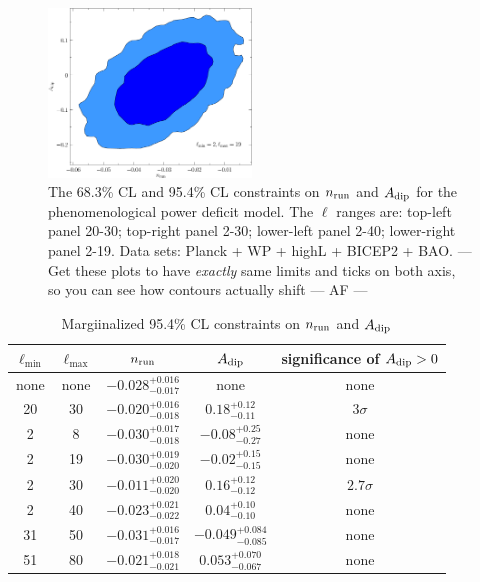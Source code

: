 \documentclass[a4paper,11pt]{article}
\def \halffigwidth{0.48\textwidth}
\begin{document}
\begin{figure}
  \includegraphics[width = \halffigwidth]{ldip2to19_nrun_dipamp_2D.pdf} 
  \caption{The 68.3\% CL and 95.4\% CL constraints on $n_{\rm run}$ and $A_{\rm dip}$ for the phenomenological power deficit model. The $\ell$ ranges are: top-left panel 20-30;  top-right panel 2-30; lower-left panel 2-40; lower-right panel 2-19. Data sets: Planck + WP + highL + BICEP2 + BAO. {\color{red} --- Get these plots to have \textit{exactly} same limits and ticks on both axis, so you can see how contours actually shift --- AF ---} \label{fig:nrunadip}}
\end{figure}


\begin{table}
\caption{Margiinalized 95.4\% CL constraints on $n_{\rm run}$ and $A_{\rm dip}$ \label{tbl:nrunadip}}
\centering
\begin{tabular}{ccccc}
\hline
\hline
$\ell_{\min}$ & $\ell_{\max}$ & $n_{\rm run}$ & $A_{\rm dip}$ & significance of $A_{\rm dip}>0$\\
\hline
none & none & $-0.028^{+0.016}_{-0.017}$ & none & none \\
20   & 30 & $-0.020^{+0.016}_{-0.018}$ & $0.18^{+0.12}_{-0.11}$ & $3\sigma$\\
2 & 8 & $-0.030^{+0.017}_{-0.018}$  & $-0.08^{+0.25}_{-0.27}$ & none \\
2 & 19 & $-0.030^{+0.019}_{-0.020}$ &    $-0.02^{+0.15}_{-0.15}$ & none \\
2 & 30 &  $-0.011^{+0.020}_{-0.020}$   & $0.16^{+0.12}_{-0.12}$ & $2.7\sigma$\\
2 & 40 & $-0.023^{+0.021}_{-0.022}$  &  $0.04^{+0.10}_{-0.10}$ & none \\
31 & 50 & $-0.031^{+0.016}_{-0.017}$  & $-0.049^{+0.084}_{-0.085}$ & none\\
51 & 80 & $-0.021^{+0.018}_{-0.021}$  & $0.053^{+0.070}_{-0.067}$ & none\\
\hline
\end{tabular}
\end{table}
\end{document}

